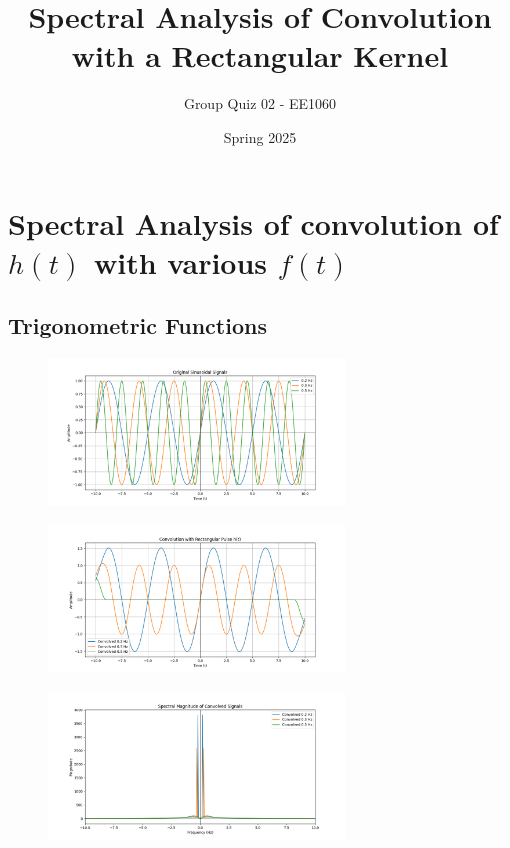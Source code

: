 \documentclass[a4paper,12pt]{article}
\begin{document}
\title{Spectral Analysis of Convolution with a Rectangular Kernel}
\author{Group Quiz 02 - EE1060}
\date{Spring 2025}
\maketitle

\section*{Spectral Analysis of convolution of $h(t)$ with various $f(t)$}
\subsection*{Trigonometric Functions}
\begin{figure}[H]
    \centering
    \includegraphics[width=0.7\textwidth]{figs/sin1.png}
\end{figure}
\begin{figure}[H]
    \centering
    \includegraphics[width=0.7\textwidth]{figs/sin2.png}
\end{figure}
\begin{figure}[H]
    \centering
    \includegraphics[width=0.7\textwidth]{figs/sin3.png}
\end{figure}
\end{document}
